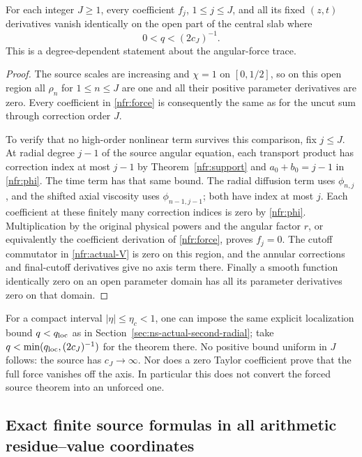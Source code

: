 \begin{theorem}\label{nfr:force-eventual}
For each integer \(J\geq1\), every coefficient \(f_j\),
\(1\leq j\leq J\), and all its fixed \((z,t)\) derivatives vanish
identically on the open part of the central slab where
\[
                0<q<(2c_J)^{-1}.
\]
This is a degree-dependent statement about the angular-force trace.
\end{theorem}
\begin{proof}
The source scales are increasing and \(\chi=1\) on \([0,1/2]\),
so on this open region all \(\rho_n\) for \(1\leq n\leq J\)
are one and all their positive parameter derivatives are zero. Every
coefficient in \eqref{nfr:force} is consequently the same as for the
uncut sum through correction order \(J\).

To verify that no high-order nonlinear term survives this comparison,
fix \(j\leq J\). At radial degree \(j-1\) of the source angular
equation, each transport product has correction index at most \(j-1\)
by Theorem~\ref{nfr:support} and \(a_0+b_0=j-1\) in
\eqref{nfr:phi}. The time term has that same bound. The radial
diffusion term uses \(\phi_{n,j}\), and the shifted axial viscosity
uses \(\phi_{n-1,j-1}\); both have index at most \(j\).
Each coefficient at these finitely many correction indices is zero
by \eqref{nfr:phi}. Multiplication by the original physical powers
and the angular factor \(r\), or equivalently the coefficient
derivation of \eqref{nfr:force}, proves \(f_j=0\).
The cutoff commutator in \eqref{nfr:actual-V} is zero on this region,
and the annular corrections and final-cutoff derivatives give no axis
term there. Finally a smooth function identically zero on an open
parameter domain has all its parameter derivatives zero on that domain.
\end{proof}

For a compact interval \(|\eta|\leq\eta_c<1\), one can impose the
same explicit localization bound \(q<q_{\rm loc}\) as in
Section~\ref{sec:ns-actual-second-radial}; take
\(q<\min(q_{\rm loc},(2c_J)^{-1})\) for the theorem there.
No positive bound uniform in \(J\) follows: the source has
\(c_J\longrightarrow\infty\). Nor does a zero Taylor coefficient
prove that the full force vanishes off the axis. In particular this
does not convert the forced source theorem into an unforced one.

\subsection{Exact finite source formulas in all arithmetic residue--value coordinates}

